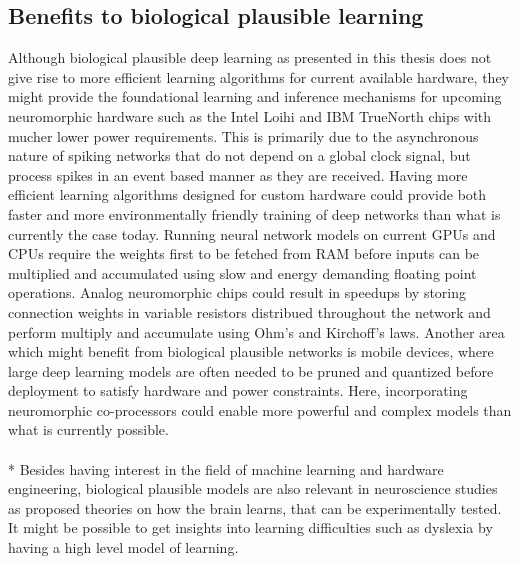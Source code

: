 \documentclass[a4paper,11pt]{article} %
\begin{document}
\subsection{Benefits to biological plausible learning}
Although biological plausible deep learning as presented in this thesis does not give rise to more efficient learning algorithms for current available hardware, they might provide the foundational learning and inference mechanisms for upcoming neuromorphic hardware such as the Intel Loihi and IBM TrueNorth chips with mucher lower power requirements. This is primarily due to the asynchronous nature of spiking networks that do not depend on a global clock signal, but process spikes in an event based manner as they are received. Having more efficient learning algorithms designed for custom hardware could provide both faster and more environmentally friendly training of deep networks than what is currently the case today.
Running neural network models on current GPUs and CPUs require the weights first to be fetched from RAM before inputs can be multiplied and accumulated using slow and energy demanding floating point operations. Analog neuromorphic chips could result in speedups by storing connection weights in variable resistors distribued throughout the network and perform multiply and accumulate using Ohm's and Kirchoff's laws. 
Another area which might benefit from biological plausible networks is mobile devices, where large deep learning models are often needed to be pruned and quantized before deployment to satisfy hardware and power constraints. Here, incorporating neuromorphic co-processors could enable more powerful and complex models than what is currently possible.\\
\\*
Besides having interest in the field of machine learning and hardware engineering, biological plausible models are also relevant in neuroscience studies as proposed theories on how the brain learns, that can be experimentally tested. It might be possible to get insights into learning difficulties such as dyslexia by having a high level model of learning.

\newpage
\end{document}
